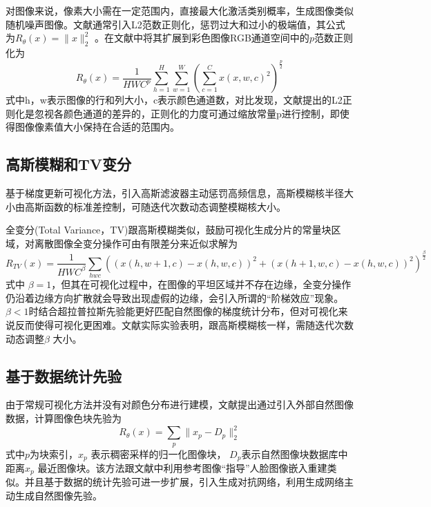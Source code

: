    对图像来说，像素大小需在一定范围内，直接最大化激活类别概率，生成图像类似随机噪声图像。文献通常引入L2范数正则化，惩罚过大和过小的极端值，其公式为$R_{\theta}(x)=\parallel x \parallel _{2}^{2}$ 。在文献\citep{Mahendran2015}中将其扩展到彩色图像RGB通道空间中的$p$范数正则化为
\begin{equation} \label{eq:ch04_05}
       R_{\theta}(x)= \frac{1}{HWC^p}\sum_{h=1}^{H}\sum_{w=1}^{W}(\sum_{c=1}^{C}x(x,w,c)^2)^{\frac{p}{2}}
\end{equation}
式中h，w表示图像的行和列大小，c表示颜色通道数，对比发现，文献提出的L2正则化是忽视各颜色通道的差异的，正则化的力度可通过缩放常量p进行控制，即使得图像像素值大小保持在合适的范围内。
\subsection{高斯模糊和TV变分}

基于梯度更新可视化方法，引入高斯滤波器主动惩罚高频信息\citep{JasonYosinski2015}，高斯模糊核半径大小由高斯函数的标准差控制，可随迭代次数动态调整模糊核大小。


全变分\citep{Mahendran2015}(Total Variance，TV)跟高斯模糊类似，鼓励可视化生成分片的常量块区域，对离散图像全变分操作可由有限差分来近似求解为    \begin{equation} \label{eq:ch04_06}
       R_{TV}(x)= \frac{1}{HWC^\beta}\sum _{hwc}((x(h,w+1,c)-x(h,w,c))^2+(x(h+1,w,c)-x(h,w,c))^2)^{\frac{\beta}{2}}
\end{equation}
式中 $\beta =1$，但其在可视化过程中，在图像的平坦区域并不存在边缘，全变分操作仍沿着边缘方向扩散就会导致出现虚假的边缘，会引入所谓的“阶梯效应”现象。 $\beta<1$时结合超拉普拉斯先验\citep{Krishnan2009}能更好匹配自然图像的梯度统计分布，但对可视化来说反而使得可视化更困难。文献实际实验表明，跟高斯模糊核一样，需随迭代次数动态调整$\beta$ 大小。
\subsection{基于数据统计先验}

	由于常规可视化方法并没有对颜色分布进行建模，文献\citep{Lenc2015}提出通过引入外部自然图像数据，计算图像色块先验为
\begin{equation} \label{eq:ch04_07}
       R_{\theta}(x)= \sum_{p}\parallel x_{p}-D_{p}\parallel _{2}^{2}
\end{equation}
式中$p$为块索引，$x_{p}$ 表示稠密采样的归一化图像块， $D_{p}$表示自然图像块数据库中距离$x_{p}$ 最近图像块。该方法跟文献\citep{Huang2017c}中利用参考图像“指导”人脸图像嵌入重建类似。并且基于数据的统计先验可进一步扩展，引入生成对抗网络，利用生成网络主动生成自然图像先验\citep{Nguyen2016a}。

